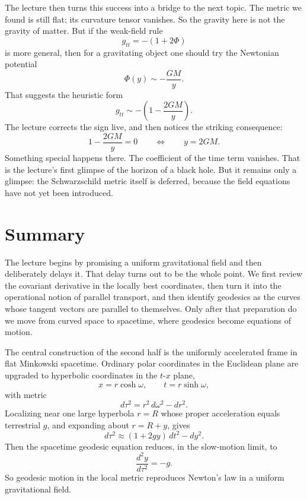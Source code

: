 The lecture then turns this success into a bridge to the next topic. The metric we found is still flat; its curvature tensor vanishes. So the gravity here is not the gravity of matter. But if the weak-field rule
\begin{equation}
g_{tt}=-(1+2\Phi)
\end{equation}
is more general, then for a gravitating object one should try the Newtonian potential
\begin{equation}
\Phi(y)\sim -\frac{GM}{y}.
\end{equation}
That suggests the heuristic form
\begin{equation}
g_{tt}\sim -\left(1-\frac{2GM}{y}\right).
\end{equation}
The lecture corrects the sign live, and then notices the striking consequence:
\begin{equation}
1-\frac{2GM}{y}=0
\qquad \Longleftrightarrow \qquad
y=2GM.
\end{equation}
Something special happens there. The coefficient of the time term vanishes. That is the lecture's first glimpse of the horizon of a black hole. But it remains only a glimpse: the Schwarzschild metric itself is deferred, because the field equations have not yet been introduced.

\section{Summary}

The lecture begins by promising a uniform gravitational field and then deliberately delays it. That delay turns out to be the whole point. We first review the covariant derivative in the locally best coordinates, then turn it into the operational notion of parallel transport, and then identify geodesics as the curves whose tangent vectors are parallel to themselves. Only after that preparation do we move from curved space to spacetime, where geodesics become equations of motion.

The central construction of the second half is the uniformly accelerated frame in flat Minkowski spacetime. Ordinary polar coordinates in the Euclidean plane are upgraded to hyperbolic coordinates in the \(t\)-\(x\) plane,
\begin{equation}
x=r\cosh\omega,
\qquad
t=r\sinh\omega,
\end{equation}
with metric
\begin{equation}
d\tau^2=r^2\,d\omega^2-dr^2.
\end{equation}
Localizing near one large hyperbola \(r=R\) whose proper acceleration equals terrestrial \(g\), and expanding about \(r=R+y\), gives
\begin{equation}
d\tau^2\approx (1+2gy)\,dt^2-dy^2.
\end{equation}
Then the spacetime geodesic equation reduces, in the slow-motion limit, to
\begin{equation}
\frac{d^2y}{d\tau^2}=-g.
\end{equation}
So geodesic motion in the local metric reproduces Newton's law in a uniform gravitational field.

